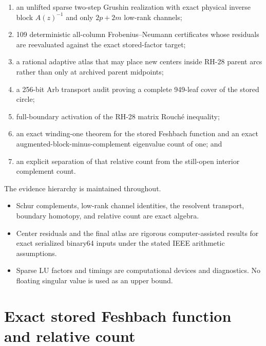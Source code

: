 \documentclass[11pt]{article}
\theoremstyle{definition}
\theoremstyle{remark}
\begin{document}
\begin{enumerate}
 \item an unlifted sparse two-step Grushin realization with exact physical
       inverse block $A(z)^{-1}$ and only $2p+2m$ low-rank channels;
 \item 109 deterministic all-column Frobenius--Neumann certificates whose
       residuals are reevaluated against the exact stored-factor target;
 \item a rational adaptive atlas that may place new centers inside RH-28
       parent arcs rather than only at archived parent midpoints;
 \item a 256-bit Arb transport audit proving a complete 949-leaf cover of
       the stored circle;
 \item full-boundary activation of the RH-28 matrix Rouch\'e inequality;
 \item an exact winding-one theorem for the stored Feshbach function and an
       exact augmented-block-minus-complement eigenvalue count of one; and
 \item an explicit separation of that relative count from the still-open
       interior complement count.
\end{enumerate}

The evidence hierarchy is maintained throughout.

\begin{itemize}
 \item Schur complements, low-rank channel identities, the resolvent
       transport, boundary homotopy, and relative count are exact algebra.
 \item Center residuals and the final atlas are rigorous computer-assisted
       results for exact serialized binary64 inputs under the stated IEEE
       arithmetic assumptions.
 \item Sparse LU factors and timings are computational devices and
       diagnostics.  No floating singular value is used as an upper bound.
\end{itemize}

\section{Exact stored Feshbach function and relative count}
\label{sec:stored-model}
\end{document}
